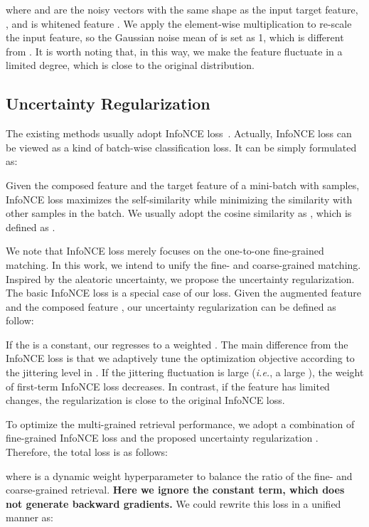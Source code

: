 \documentclass[10pt,twocolumn,letterpaper]{article}
\def\ie{\emph{i.e.}}
\begin{document}
where  and  are the noisy vectors with the same shape as the input target feature, , and  is whitened feature . We apply the element-wise multiplication to re-scale the input feature, so the Gaussian noise mean of  is set as 1, which is different from . It is worth noting that, in this way, we make the feature fluctuate in a limited degree, which is close to the original distribution.   


\subsection{Uncertainty Regularization}
The existing methods usually adopt InfoNCE loss~\cite{NIPS2004_42fe8808, Movshovitz-Attias_2017_ICCV,NIPS2017_cb8da676, Gidaris_2018_CVPR, TIRG, 2021CoSMo}. Actually, InfoNCE loss can be viewed as a kind of batch-wise classification loss. It can be simply formulated as:\vspace{-2mm}

Given the composed feature  and the target feature  of a mini-batch with  samples, InfoNCE loss maximizes the self-similarity  while minimizing the similarity with other samples   in the batch. We usually adopt the cosine similarity as , which is defined as . 

We note that InfoNCE loss merely focuses on the one-to-one fine-grained matching. In this work, we intend to unify the fine- and coarse-grained matching. Inspired by the aleatoric uncertainty, we propose the uncertainty regularization. The basic InfoNCE loss is a special case of our loss. Given the augmented feature  and the composed feature , our uncertainty regularization can be defined as follow: \vspace{-2mm}

If the  is a constant, our  regresses to a weighted . 
The main difference from the InfoNCE loss is that we adaptively tune the optimization objective according to the jittering level in . If the jittering fluctuation is large (\ie, a large ), the weight of first-term InfoNCE loss decreases. In contrast, if the feature has limited changes, the regularization is close to the original InfoNCE loss.  



To optimize the multi-grained retrieval performance, we adopt a combination of fine-grained InfoNCE loss  and the proposed uncertainty regularization . Therefore, the total loss is as follows:\vspace{-2mm}

where  is a dynamic weight hyperparameter to balance the ratio of the fine- and coarse-grained retrieval. \textbf{Here we ignore the constant term, which does not generate backward gradients.} We could rewrite this loss in a unified manner as:\vspace{-2mm}
\end{document}
